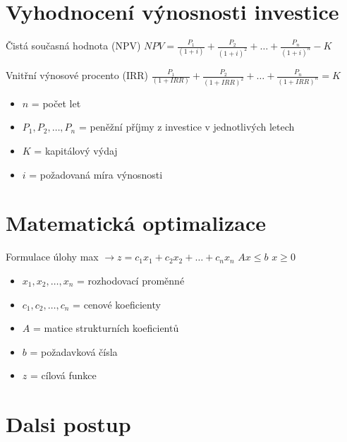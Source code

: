 \documentclass[12pt, aspectratio=169]{beamer} %
\begin{document}
\section{Vyhodnocení výnosnosti investice}

\begin{frame}{\insertsection}
    \begin{block}{Čistá současná hodnota (NPV)}
        \vspace{10pt}
        \centering
        $NPV = \frac{P_1}{(1+i)} + \frac{P_2}{(1+i)^2} + \ldots + \frac{P_n}{(1+i)^n} - K$
    \end{block}

    \begin{block}{Vnitřní výnosové procento (IRR)}
        \vspace{10pt}
        \centering
        $\frac{P_1}{(1+IRR)} + \frac{P_2}{(1+IRR)^2} + \ldots + \frac{P_n}{(1+IRR)^n} = K$
    \end{block}
    \begin{itemize}
        \item $n$ = počet let
        \item $P_1, P_2, \ldots, P_n$ = peněžní příjmy z investice v jednotlivých letech
        \item $K$ = kapitálový výdaj
        \item $i$ = požadovaná míra výnosnosti
    \end{itemize}
\end{frame}


\section{Matematická optimalizace}

\begin{frame}{\insertsection}
    \begin{block}{Formulace úlohy}
        \vspace{10pt}
        \centering
        max $\rightarrow z = c_1x_1 + c_2x_2 + \ldots + c_nx_n$
        \break
        $Ax \leq b$
        \break
        $x \geq 0$
    \end{block}
    \begin{itemize}
        \item $x_1, x_2, \ldots, x_n$ = rozhodovací proměnné
        \item $c_1, c_2, \ldots, c_n$ = cenové koeficienty
        \item $A$ = matice strukturních koeficientů
        \item $b$ = požadavková čísla
        \item $z$ = cílová funkce
    \end{itemize}

\end{frame}

\section{Dalsi postup}
\end{document}
